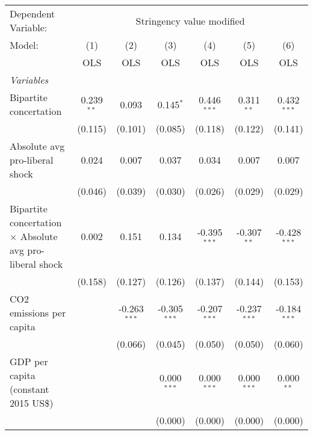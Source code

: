 
\begingroup
\centering
\begin{tabular}{lcccccc}
   \toprule
   Dependent Variable: & \multicolumn{6}{c}{Stringency value modified}\\
   Model:                                                          & (1)          & (2)            & (3)            & (4)            & (5)            & (6)\\  
                                                                   &  OLS         & OLS            & OLS            & OLS            & OLS            & OLS\\  
   \midrule
   \emph{Variables}\\
   Bipartite concertation                                          & 0.239$^{**}$ & 0.093          & 0.145$^{*}$    & 0.446$^{***}$  & 0.311$^{**}$   & 0.432$^{***}$\\   
                                                                   & (0.115)      & (0.101)        & (0.085)        & (0.118)        & (0.122)        & (0.141)\\   
   Absolute avg pro-liberal shock                                  & 0.024        & 0.007          & 0.037          & 0.034          & 0.007          & 0.007\\   
                                                                   & (0.046)      & (0.039)        & (0.030)        & (0.026)        & (0.029)        & (0.029)\\   
   Bipartite concertation $\times$ Absolute avg pro-liberal shock  & 0.002        & 0.151          & 0.134          & -0.395$^{***}$ & -0.307$^{**}$  & -0.428$^{***}$\\   
                                                                   & (0.158)      & (0.127)        & (0.126)        & (0.137)        & (0.144)        & (0.153)\\   
   CO2 emissions per capita                                        &              & -0.263$^{***}$ & -0.305$^{***}$ & -0.207$^{***}$ & -0.237$^{***}$ & -0.184$^{***}$\\   
                                                                   &              & (0.066)        & (0.045)        & (0.050)        & (0.050)        & (0.060)\\   
   GDP per capita (constant 2015 US\$)                             &              &                & 0.000$^{***}$  & 0.000$^{***}$  & 0.000$^{***}$  & 0.000$^{**}$\\   
                                                                   &              &                & (0.000)        & (0.000)        & (0.000)        & (0.000)\\   

\end{tabular}
